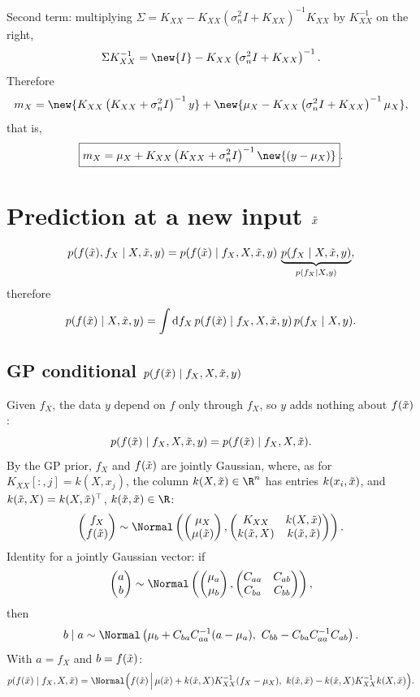 Second term: multiplying $\Sigma = K_{XX} - K_{XX}(\sigma_n^2 I + K_{XX})^{-1}K_{XX}$ by $K_{XX}^{-1}$ on the right,
\[
\Sigma K_{XX}^{-1} = \new{I} - K_{XX}\left(\sigma_n^2 I + K_{XX}\right)^{-1}.
\]
Therefore
\[
m_X = \new{K_{XX}\left(K_{XX} + \sigma_n^2 I\right)^{-1}y} + \new{\mu_X - K_{XX}\left(\sigma_n^2 I + K_{XX}\right)^{-1}\mu_X},
\]
that is,
\[
\boxed{m_X = \mu_X + K_{XX}\left(K_{XX} + \sigma_n^2 I\right)^{-1}\new{(y - \mu_X)}}.
\]

\section{Prediction at a new input $\tilde x$}
\[
p(f(\tilde x), f_X \mid X, \tilde x, y) = p(f(\tilde x) \mid f_X, X, \tilde x, y)\,\underbrace{p(f_X \mid X, \tilde x, y)}_{p(f_X \mid X, y)},
\]
therefore
\[
p(f(\tilde x) \mid X, \tilde x, y) = \int \mathrm{d}f_X\,p(f(\tilde x) \mid f_X, X, \tilde x, y)\,p(f_X \mid X, y).
\]

\subsection{GP conditional $p(f(\tilde x) \mid f_X, X, \tilde x, y)$}
Given $f_X$, the data $y$ depend on $f$ only through $f_X$, so $y$ adds nothing about $f(\tilde x)$:
\[
p(f(\tilde x) \mid f_X, X, \tilde x, y) = p(f(\tilde x) \mid f_X, X, \tilde x).
\]
By the GP prior, $f_X$ and $f(\tilde x)$ are jointly Gaussian, where, as for $K_{XX}[:,j] = k(X, x_j)$, the column $k(X, \xt) \in \R^n$ has entries $k(x_i, \tilde x)$, and $k(\tilde x, X) = k(X, \tilde x)^{\top}$, $k(\xt, \xt) \in \R$:
\[
\begin{pmatrix}f_X\\ f(\xt)\end{pmatrix} \sim \Normal\left(\begin{pmatrix}\mu_X\\ \mu(\xt)\end{pmatrix}, \begin{pmatrix}K_{XX} & k(X, \xt)\\ k(\xt, X) & k(\xt, \xt)\end{pmatrix}\right).
\]
Identity for a jointly Gaussian vector: if
\[
\begin{pmatrix}a\\ b\end{pmatrix} \sim \Normal\left(\begin{pmatrix}\mu_a\\ \mu_b\end{pmatrix}, \begin{pmatrix}C_{aa} & C_{ab}\\ C_{ba} & C_{bb}\end{pmatrix}\right),
\]
then
\[
b \mid a \sim \Normal\left(\mu_b + C_{ba}C_{aa}^{-1}(a - \mu_a),\ C_{bb} - C_{ba}C_{aa}^{-1}C_{ab}\right).
\]
With $a = f_X$ and $b = f(\tilde x)$:
\[
p(f(\xt) \mid f_X, X, \xt) = \Normal\Big(f(\xt) \,\Big|\, \mu(\xt) + k(\xt, X)K_{XX}^{-1}(f_X - \mu_X),\ k(\xt, \xt) - k(\xt, X)K_{XX}^{-1}k(X, \xt)\Big).
\]

